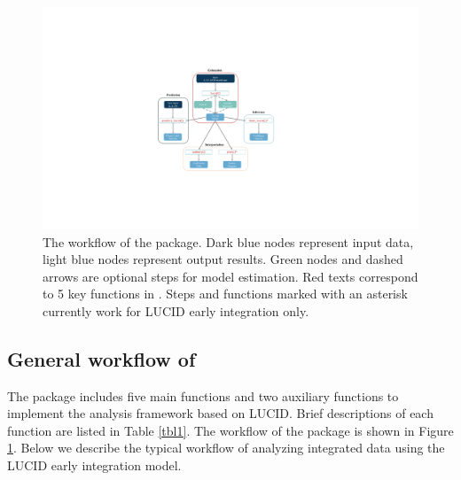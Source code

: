 \begin{figure}[]
    \centering
    \includegraphics[scale = 0.5]{figures/fig2.pdf}
    \caption{The workflow of the  package. Dark blue nodes represent input data, light blue nodes represent output results. Green nodes and dashed arrows are optional steps for model estimation. Red texts correspond to 5 key functions in . Steps and functions marked with an asterisk currently work for LUCID early integration only.}
    \label{fig2}
\end{figure}

\subsection{General workflow of } \label{sec2.2}

The  package includes five main functions and two auxiliary functions to implement the analysis framework based on LUCID. Brief descriptions of each function are listed in Table \ref{tbl1}. The workflow of the  package is shown in Figure \ref{fig2}. Below we describe the typical workflow of analyzing integrated data using the LUCID early integration model.

